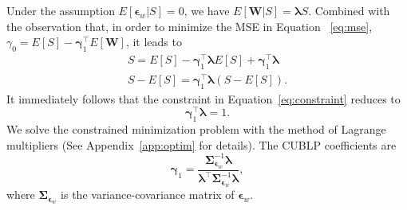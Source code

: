 \documentclass[man, floatsintext]{apa7}
\newcommand{\mbf}[1]{\bm{#1}}
\newcommand{\beps}{\mbf{\epsilon}}
\newcommand{\bgamma}{\mbf{\gamma}}
\newcommand{\blambda}{\mbf{\lambda}}
\newcommand{\bW}{\mbf{W}}
\begin{document}
  Under the assumption $E[\mbf{\epsilon}_w|S] = 0$, we have $E[\bW|S] =
  \blambda S$. Combined
  with the observation that, in order to minimize the MSE in Equation~
  \ref{eq:mse},
  $\gamma_0 = E[S] -
  \mbf{\gamma}_1^\top E[\mbf{W}]$, it leads to
  \begin{equation}
  \begin{gathered}
    S = E[S] - \mbf{\gamma}_1^\top \mbf{\lambda} E[S] + \mbf{\gamma}_1^\top
           \mbf{\lambda} \\
    S-E[S] = \mbf{\gamma}_1^\top \mbf{\lambda} (S - E[S]).
  \end{gathered}    
  \end{equation}
  It immediately follows that the constraint in Equation~\ref{eq:constraint}
  reduces to
  \begin{equation}
    \mbf{\gamma}_1^\top \blambda = 1.
  \end{equation}
  We solve the constrained minimization problem with the method of Lagrange
  multipliers (See Appendix~\ref{app:optim} for details). The CUBLP
  coefficients are
  \begin{equation}
  \label{eq:coef_cublp}
    \bgamma_{1} = \frac{\mbf{\Sigma}^{-1}_{\beps_w} \blambda}{
      \blambda^\top \mbf{\Sigma}^{-1}_{\beps_w} \blambda},
  \end{equation}
  where $\mbf{\Sigma}_{\beps_w}$ is the variance-covariance matrix of $\beps_w$.
\end{document}
